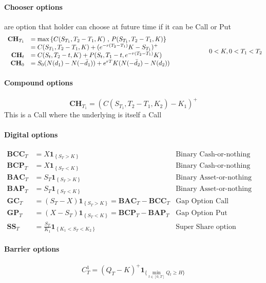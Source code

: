\documentclass[a4paper,10pt]{article}
\begin{document}
\paragraph{Chooser options} are option that holder can choose at future time if it can be Call or Put
\[
\begin{array}{rl}
\textbf{CH}_{T_1} &=  \text{max}\left\{ C( S_{T_1} ,T_2 - T_1, K ) \hbox{ , }  P( S_{T_1} ,T_2 - T_1, K ) \right\}  \\
                  &=  C( S_{T_1} ,T_2 - T_1, K ) + (e^{-r(T_2-T_1)}K - S_{T_1} )^+     \\
\textbf{CH}_{t}   &=  C(S_t, T_2-t, K) + P(S_t, T_1 -t, e^{-r(T_2-T_1)}K)              \\
\textbf{CH}_{0}   &=  S_0( N(d_1) - N(-\bar{d}_1) )  + e^{rT}K( N(-\bar{d}_2) - N(d_2) )
\end{array}
\hspace{2cm}
0<K,0<T_1<T_2
\]
\paragraph{Compound options}
\[
\textbf{CH}_{T_1} = ( C(S_{T_1},T_2-T_1,K_2) - K_1 )^+
\]
This is a Call where the underlying is itself a Call
\paragraph{Digital options}
\[
\begin{array}{rll}
\textbf{BCC}_T &= X\mathbf{1}_{\left\{S_T>K\right\}} & \text{Binary Cash-or-nothing Call} \\
\textbf{BCP}_T &= X\mathbf{1}_{\left\{S_T<K\right\}} & \text{Binary Cash-or-nothing Put}  \\
\textbf{BAC}_T &= S_T\mathbf{1}_{\left\{S_T>K\right\}} & \text{Binary Asset-or-nothing Call} \\
\textbf{BAP}_T &= S_T\mathbf{1}_{\left\{S_T<K\right\}} & \text{Binary Asset-or-nothing Put}  \\
\textbf{GC}_T &= (S_T-X)\mathbf{1}_{\left\{S_T>K\right\}}=\textbf{BAC}_T - \textbf{BCC}_T & \text{Gap Option Call}  \\
\textbf{GP}_T &= (X-S_T)\mathbf{1}_{\left\{S_T<K\right\}}=\textbf{BCP}_T - \textbf{BAP}_T & \text{Gap Option Put}   \\
\textbf{SS}_T &=\frac{S_T}{K_1} \mathbf{1}_{\left\{K_1<S_T<K_2\right\}} & \text{Super Share option}   
\end{array}
\]
\paragraph{Barrier options}
\[
C^1_T = ( Q_T - K)^{+} \mathbf{1}_{ \{ \displaystyle\min_{t\in [0,T]}  Q_t \geq H \} }
\]
\end{document}
